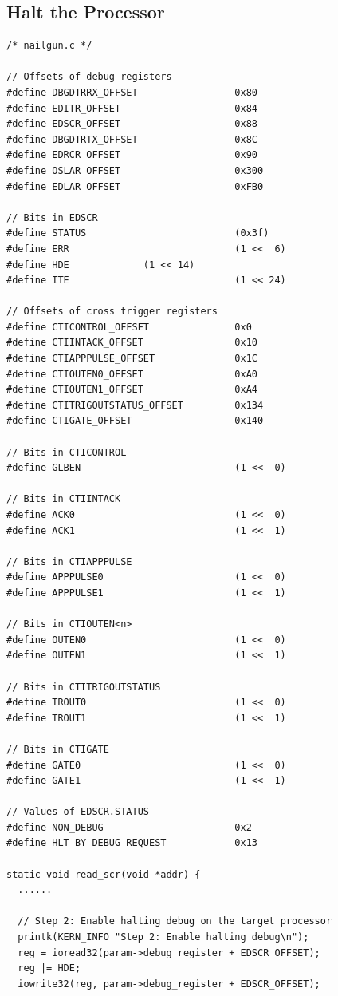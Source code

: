 \subsection{Halt the Processor}

\begin{lstlisting}
/* nailgun.c */

// Offsets of debug registers
#define DBGDTRRX_OFFSET                 0x80
#define EDITR_OFFSET                    0x84
#define EDSCR_OFFSET                    0x88
#define DBGDTRTX_OFFSET                 0x8C
#define EDRCR_OFFSET                    0x90
#define OSLAR_OFFSET                    0x300
#define EDLAR_OFFSET                    0xFB0

// Bits in EDSCR
#define STATUS                          (0x3f)
#define ERR                             (1 <<  6)
#define HDE				(1 << 14)
#define ITE                             (1 << 24)

// Offsets of cross trigger registers
#define CTICONTROL_OFFSET               0x0
#define CTIINTACK_OFFSET                0x10
#define CTIAPPPULSE_OFFSET              0x1C
#define CTIOUTEN0_OFFSET                0xA0
#define CTIOUTEN1_OFFSET                0xA4
#define CTITRIGOUTSTATUS_OFFSET         0x134
#define CTIGATE_OFFSET                  0x140

// Bits in CTICONTROL
#define GLBEN                           (1 <<  0)

// Bits in CTIINTACK
#define ACK0                            (1 <<  0)
#define ACK1                            (1 <<  1)

// Bits in CTIAPPPULSE
#define APPPULSE0                       (1 <<  0)
#define APPPULSE1                       (1 <<  1)

// Bits in CTIOUTEN<n>
#define OUTEN0                          (1 <<  0)
#define OUTEN1                          (1 <<  1)

// Bits in CTITRIGOUTSTATUS
#define TROUT0                          (1 <<  0)
#define TROUT1                          (1 <<  1)

// Bits in CTIGATE
#define GATE0                           (1 <<  0)
#define GATE1                           (1 <<  1)

// Values of EDSCR.STATUS
#define NON_DEBUG                       0x2
#define HLT_BY_DEBUG_REQUEST            0x13

static void read_scr(void *addr) {
  ......

  // Step 2: Enable halting debug on the target processor
  printk(KERN_INFO "Step 2: Enable halting debug\n");
  reg = ioread32(param->debug_register + EDSCR_OFFSET);
  reg |= HDE;
  iowrite32(reg, param->debug_register + EDSCR_OFFSET);


\end{lstlisting}
